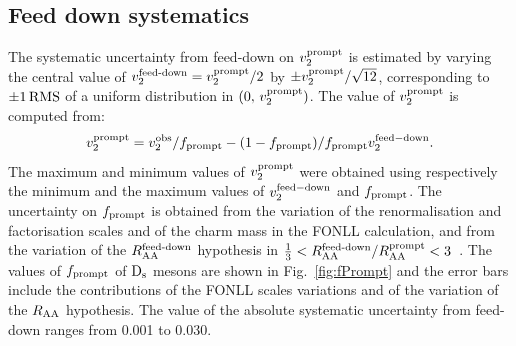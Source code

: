 \subsection{Feed down systematics}
\label{FDsystV2}
The systematic uncertainty from feed-down on $v_{2}^{\rm prompt}$ 
is estimated by varying the central value of 
$v_{2}^{\rm feed\textnormal{-}down}=v_{2}^{\rm prompt}/2$ by $ \pm v_{2}^{\rm prompt}/\sqrt{12}$, corresponding to 
$\rm \pm 1\,RMS$ of a uniform distribution in $(0,\,v_{2}^{\rm prompt})$.
The value of $v_2^{\rm prompt}$ is computed from:
\begin{equation}
v_{2}^{\rm prompt}=v_{2}^{\rm obs}/f_{\rm prompt} - (1-f_{\rm prompt})/f_{\rm prompt}v_{2}^{\rm feed-down}.
\end{equation} 
The maximum and minimum values of $v_2^{\rm prompt}$ were
obtained using respectively the minimum and the maximum values 
of $v_{\rm 2}^{\rm feed-down}$ and $f_{\rm prompt}$. 
The uncertainty on $f_{\rm prompt}$ is obtained from the
variation of the renormalisation and factorisation scales and of the charm
mass in the FONLL calculation, and from the variation of the 
$R_{\rm AA}^{\rm feed\textnormal{-}down}$ hypothesis in  
$\frac{1}{3}< R_{\rm AA}^{\rm feed\textnormal{-}down}/R_{\rm AA}^{\rm prompt}<3$~\cite{Adam:2015jda}. 
The values of $f_{\rm prompt}$ of ${\rm D_s}$ mesons
are shown in Fig.~\ref{fig:fPrompt} and the error bars include the
contributions of the FONLL scales variations and of the variation of
the $R_{\rm AA}$ hypothesis. The value of the absolute systematic uncertainty from feed-down ranges from 0.001 to 0.030.

